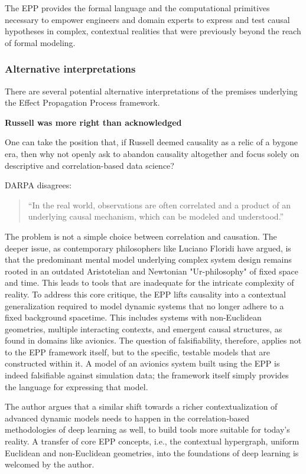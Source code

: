 The EPP provides the formal language and the computational primitives necessary to empower engineers and domain experts to express and test causal hypotheses in complex, contextual realities that were previously beyond the reach of formal modeling.

\subsubsection{Alternative interpretations}

There are several potential alternative interpretations of the premises underlying the Effect Propagation Process framework.

\textbf{Russell was more right than acknowledged}

One can take the position that, if Russell deemed causality as a relic of a bygone era, then why not openly ask to abandon causality altogether and focus solely on descriptive and correlation-based data science?

DARPA disagrees\cite{DARPA_ANSR}:

\begin{quote}
    “In the real world, observations are often correlated and a product of an underlying causal mechanism, which can be modeled and understood.”
\end{quote}

The problem is not a simple choice between correlation and causation. The deeper issue, as contemporary philosophers
like Luciano Floridi have argued, is that the predominant mental model underlying complex system design remains rooted
in an outdated Aristotelian and Newtonian "Ur-philosophy" of fixed space and time. This leads to tools that are
inadequate for the intricate complexity of reality. To address this core critique, the EPP lifts causality into a
contextual generalization required to model dynamic systems that no longer adhere to a fixed background spacetime. This
includes systems with non-Euclidean geometries, multiple interacting contexts, and emergent causal structures, as found
in domains like avionics. The question of falsifiability, therefore, applies not to the EPP framework itself, but to the
specific, testable models that are constructed within it. A model of an avionics system built using the EPP is indeed
falsifiable against simulation data; the framework itself simply provides the language for expressing that model.

The author argues that a similar shift towards a richer contextualization of advanced dynamic models needs to happen in the
correlation-based methodologies of deep learning as well, to build tools more suitable for today's reality. A
transfer of core EPP concepts, i.e., the contextual hypergraph, uniform Euclidean and non-Euclidean geometries, into the
foundations of deep learning is welcomed by the author.

